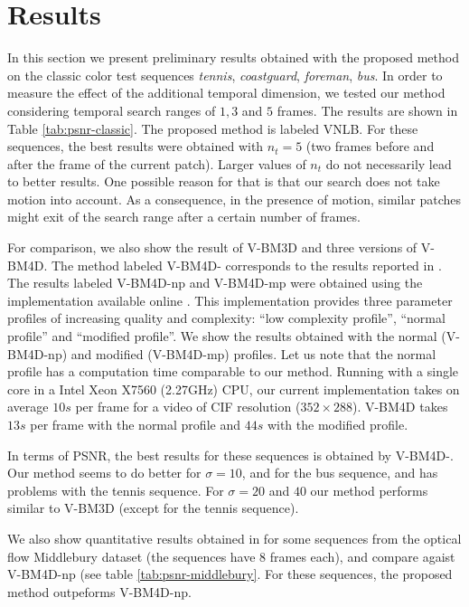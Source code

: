 \documentclass{llncs}
\begin{document}
\section{Results}
\label{sec:results}

In this section we present preliminary results obtained with the proposed
method on the classic color test sequences \emph{tennis}, \emph{coastguard}, \emph{foreman},
\emph{bus}. In order to measure the effect of the additional temporal
dimension, we tested our method considering temporal search ranges of $1, 3$ and $5$ frames.
The results are shown in Table \ref{tab:psnr-classic}. The proposed method is labeled VNLB.
For these sequences, the best results were obtained with
$n_t = 5$ (two frames before and after the frame of the current patch). Larger 
values of $n_t$ do not necessarily lead to better results. One possible reason
for that is that our search does not take motion into account. As a
consequence, in the presence of motion, similar patches might exit of the
search range after a certain number of frames.

For comparison, we also show the result of V-BM3D and three versions of V-BM4D.
The method labeled V-BM4D-\cite{Maggioni2012} corresponds to the results reported
in \cite{Maggioni2012}. The results labeled V-BM4D-np and V-BM4D-mp were
obtained using the implementation available online \cite{bm4dcode}. This
implementation provides three parameter profiles of increasing quality and
complexity: ``low complexity profile'', ``normal profile'' and ``modified
profile''. We show the results obtained with the normal (V-BM4D-np) and
modified (V-BM4D-mp) profiles.
Let us note that the normal profile has a
computation time comparable to our method. Running with a
single core in a Intel Xeon X7560 (2.27GHz) CPU, 
our current implementation takes on average $10s$ per frame for a video of CIF
resolution ($352\times288$). V-BM4D takes $13s$ per frame with the normal
profile and $44s$ with the modified profile.

In terms of PSNR, the best results for these sequences is obtained by
V-BM4D-\cite{Maggioni2012}. Our method seems to do better for $\sigma = 10$,
and for the bus sequence, and has problems with the tennis sequence. For
$\sigma = 20$ and $40$ our method performs similar to V-BM3D (except for the
tennis sequence). 

We also show quantitative results obtained in for some sequences from the
optical flow Middlebury dataset (the sequences have 8 frames each), and compare
agaist V-BM4D-np (see table \ref{tab:psnr-middlebury}. For these sequences, the
proposed method outpeforms V-BM4D-np. 
\end{document}
